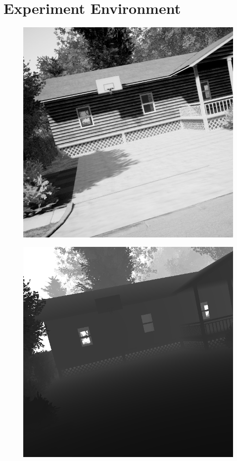 \section{Experiment Environment}

\begin{figure}[htbp]
\centering
  \begin{minipage}[h]{0.45\linewidth}
    \centering
    \includegraphics[keepaspectratio, scale=0.11]{./figure/3_environment/image10_0.png}
    \label{fig:known_env_image}
  \end{minipage} 
  \begin{minipage}[h]{0.45\linewidth}
    \centering
    \includegraphics[keepaspectratio, scale=0.11]{./figure/3_environment/depth10_0.png}

\end{minipage}
\end{figure}
